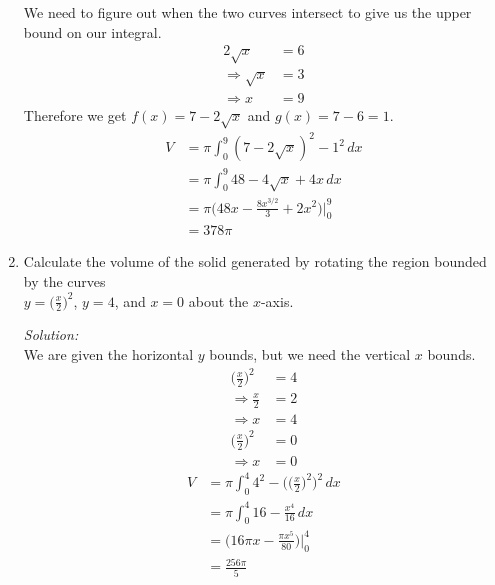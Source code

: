 \documentclass[16pt]{article}
\theoremstyle{remark}
\begin{document}
\begin{enumerate}
\begin{mdframed}[style=TheoremFrame]
We need to figure out when the two curves intersect to give us the upper bound on our integral.
\begin{align*}
2\sqrt{x} &= 6\\
\Rightarrow \sqrt{x} &= 3\\
\Rightarrow x &= 9
\end{align*}
Therefore we get $f(x) = 7 - 2\sqrt{x}$ and $g(x) = 7-6 = 1$.
\begin{align*}
V&= \pi \int_0^9 (7-2\sqrt{x})^2 - 1^2 \, dx\\
&= \pi \int_0^9 48 - 4 \sqrt{x}+4x \, dx\\
&= \pi \bigg(48x - \frac{8x^{3/2}}{3}+2x^2 \bigg) \bigg|_0^9\\
&= 378\pi
\end{align*}
\end{mdframed}
\newpage\item Calculate the volume of the solid generated by rotating the region bounded by the curves\\ $\displaystyle{y=\bigg(\frac{x}{2}\bigg)^2}$, $y=4$, and $x=0$ about the $x$-axis.
\begin{mdframed}[style=TheoremFrame]
\textit{Solution:}\\

We are given the horizontal $y$ bounds, but we need the vertical $x$ bounds.
\begin{align*}
 \bigg(\frac{x}{2}\bigg)^2 &= 4\\
\Rightarrow \frac{x}{2} &= 2\\
\Rightarrow x &= 4
\end{align*}
\begin{align*}
\bigg(\frac{x}{2}\bigg)^2 &= 0\\
\Rightarrow x &= 0
\end{align*}
\begin{align*}
V&= \pi \int_0^4  4^2 - \bigg(\bigg(\frac{x}{2}\bigg)^2 \bigg)^2 \, dx\\
&= \pi \int_0^4 16 -\frac{x^4}{16} \, dx\\
&= \bigg(16\pi x - \frac{\pi x^5}{80} \bigg) \bigg|_0^4\\
&= \frac{256\pi}{5}
\end{align*}
\end{mdframed}
\end{enumerate}
\end{document}
